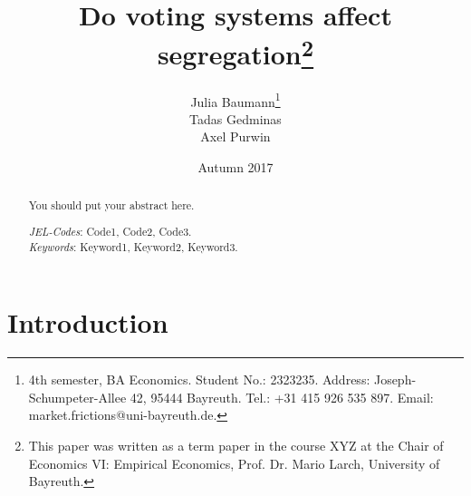 \documentclass[12pt, a4paper]{article}
\title{{\Large Do voting systems affect segregation\footnote{This paper was written as a term paper in the course XYZ at the Chair of Economics VI: Empirical Economics, Prof. Dr. Mario Larch, University of Bayreuth.}}\\
\vspace{3mm}{\Large Term Paper, Software Engineering for Economists}%
}
\author{Julia Baumann\footnote{4th semester, BA Economics. Student No.: 2323235. Address: Joseph-Schumpeter-Allee 42, 95444 Bayreuth. Tel.: +31 415 926 535 897. Email: market.frictions@uni-bayreuth.de.}\\ Tadas Gedminas\\Axel Purwin}
\date{Autumn 2017}
\begin{document}
\maketitle \thispagestyle{empty}

\begin{abstract}

\setlength{\baselineskip}{10.5pt} 

\vspace{0.5cm} 
\noindent You should put your abstract here. 
\vspace{0.5cm} 

{\normalsize \noindent \emph{JEL-Codes}:  Code1, Code2, Code3.\\ %
\emph{Keywords}: Keyword1, Keyword2, Keyword3.} %
\end{abstract}

\newpage

\thispagestyle{empty}
\tableofcontents
\newpage

\newpage
\thispagestyle{empty}
\listoftables


\newpage
\thispagestyle{empty}
\listoffigures


\newpage


\setcounter{page}{1}%


\section{\label{sec_intro}Introduction}
\end{document}

